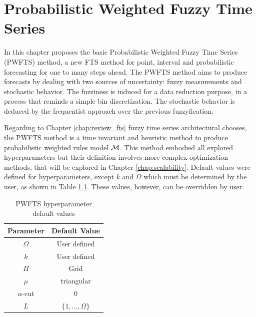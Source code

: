 \chapter[Probabilistic Weighted Fuzzy Time Series]{Probabilistic Weighted Fuzzy Time Series} 
\label{chap:pwfts}


In this chapter proposes the basic  Probabilistic Weighted Fuzzy Time Series (PWFTS) method, a new FTS method for point, interval and probabilistic forecasting for one to many steps ahead. The PWFTS method aims to produce forecasts by dealing with two sources of uncertainty: fuzzy measurements and stochastic behavior. The fuzziness is induced for a data reduction purpose, in a process that reminds a simple bin discretization. The stochastic behavior is deduced by the  frequentist approach over the previous fuzzyfication. 

Regarding to Chapter \ref{chap:review_fts} fuzzy time series architectural chooses, the PWFTS method is a  time invariant and heuristic method to produce probabilistic weighted rules model $\mathcal{M}$. This method embodied all explored hyperparameters but their definition involves more complex optimization methods, that will be explored in Chapter \ref{chap:scalability}. Default values were defined for hyperparameters, except $k$ and $\Omega$ which must be determined by the user, as shown in Table \ref{tab:pwfts_hyperparam}. These values, however, can be overridden by user. 

\begin{table}[htb] 
    \centering
    \begin{tabular}{|c|c|} \hline
        \textbf{Parameter} & \textbf{Default Value}  \\ \hline
        $\Omega$ & User defined  \\ \hline
        $k$ & User defined  \\ \hline
        $\Pi$ & Grid \\ \hline
        $\mu$ & triangular  \\ \hline 
        $\alpha$-cut & 0 \\ \hline
        $L$ & $\{1,\ldots,\Omega\}$  \\ \hline
    \end{tabular}
    \caption{PWFTS hyperparameter default values}
    \label{tab:pwfts_hyperparam}
\end{table}

